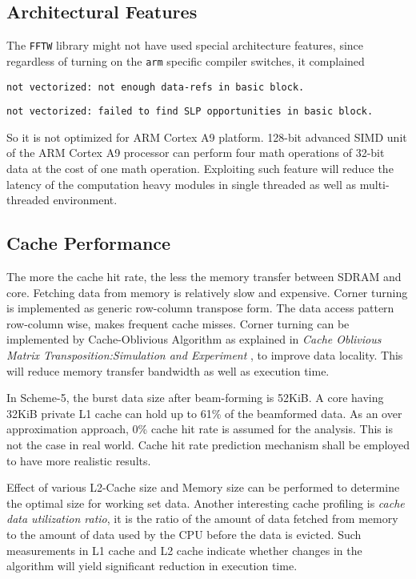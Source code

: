 \subsection{Architectural Features}
The \verb|FFTW| library might not have used special architecture features, since regardless of turning on the \verb|arm| specific compiler switches, it complained 
\begin{compactitem}
	\item[] \verb|not vectorized: not enough data-refs in basic block.|
	\item[] \verb|not vectorized: failed to find SLP opportunities in basic block.|
\end{compactitem}
So it is not optimized for ARM Cortex A9 platform. 128-bit advanced SIMD unit of the ARM Cortex A9 processor can perform four math operations of 32-bit data at the cost of one math operation. Exploiting such feature will reduce the latency of the computation heavy modules in single threaded as well as multi-threaded environment.

\subsection{Cache Performance}
The more the cache hit rate, the less the memory transfer between SDRAM and core. Fetching data from memory is relatively slow and expensive. Corner turning is implemented as generic row-column transpose form. The data access pattern row-column wise, makes frequent cache misses. Corner turning can be implemented by Cache-Oblivious Algorithm as explained in \textsl{Cache Oblivious Matrix Transposition:Simulation and Experiment} \cite{cot}, to improve data locality. This will reduce memory transfer bandwidth as well as execution time.  

In Scheme-5, the burst data size after beam-forming is 52KiB. A core having 32KiB private L1 cache can hold up to 61\% of the beamformed data. As an over approximation approach, 0\% cache hit rate is assumed for the analysis. This is not the case in real world. Cache hit rate prediction mechanism shall be employed to have more realistic results.

Effect of various L2-Cache size and Memory size can be performed to determine the optimal size for working set data. Another interesting cache profiling is \textsl{cache data utilization ratio}, it is the ratio of the amount of data fetched from memory to the amount of data used by the CPU before the data is evicted. Such measurements in L1 cache and L2 cache indicate whether changes in the algorithm will yield significant reduction in execution time.

